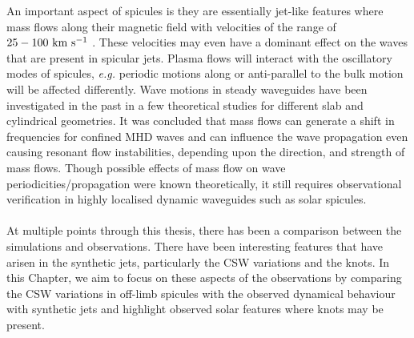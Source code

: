 \documentclass[12pt]{ociamthesis}
\newcommand{\kms}{~\rm{km ~s^{-1}}}
\newcommand{\np}{\\ \\}
\begin{document}
%
An important aspect of spicules is they are essentially jet-like features where mass flows along their magnetic field with velocities of the range of $25-100\kms$  \citep{Beckers1972ARAA1073B, Sterling2000SoPh19679S, Pereira2012}. These velocities may even have a dominant effect on the waves that are present in spicular jets. Plasma flows will interact with the oscillatory modes of spicules, \textit{e.g.} periodic motions along or anti-parallel to the bulk motion will be affected differently. Wave motions in steady waveguides have been investigated in the past in a few theoretical studies \citep{Narayanan1991,nakariakov1995, terrahomem2003, soler2008} for different slab and cylindrical geometries. It was concluded that mass flows can generate a shift in frequencies for confined MHD waves and can influence the wave propagation even causing resonant flow instabilities, depending upon the direction, and strength of mass flows. Though possible effects of mass flow on wave periodicities/propagation were known theoretically, it still requires observational verification in highly localised dynamic waveguides such as solar spicules. \np
%
At multiple points through this thesis, there has been a comparison between the simulations and observations. There have been interesting features that have arisen in the synthetic jets, particularly the CSW variations and the knots. In this Chapter, we aim to focus on these aspects of the observations by comparing the CSW variations in off-limb spicules with the observed dynamical behaviour with synthetic jets and highlight observed solar features where knots may be present. \np
\end{document}
